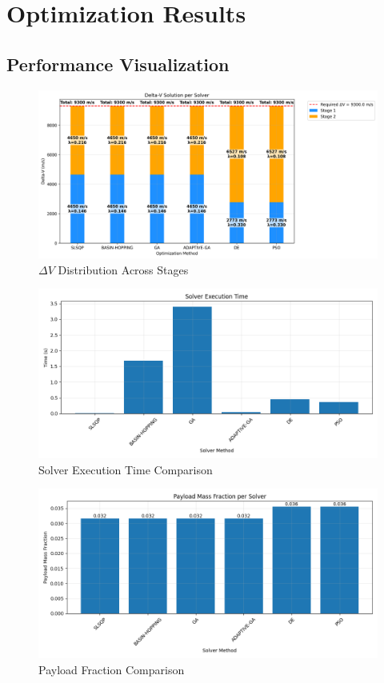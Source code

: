 \documentclass{article}
\begin{document}
\section{Optimization Results}
\subsection{Performance Visualization}
\begin{figure}[H]
\centering
\includegraphics[width=\textwidth]{dv_breakdown.png}
\caption{$\Delta V$ Distribution Across Stages}
\end{figure}

\begin{figure}[H]
\centering
\includegraphics[width=\textwidth]{execution_time.png}
\caption{Solver Execution Time Comparison}
\end{figure}

\begin{figure}[H]
\centering
\includegraphics[width=\textwidth]{payload_fraction.png}
\caption{Payload Fraction Comparison}
\end{figure}
\end{document}
